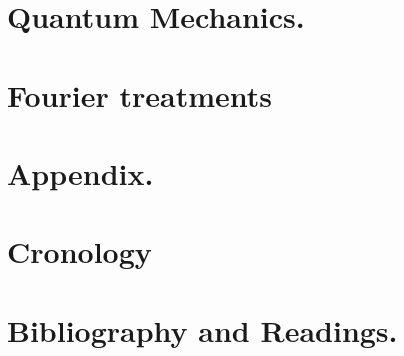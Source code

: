 \documentclass[12pt,leqno]{book}
\begin{document}
\part{Quantum Mechanics.}






\part{Fourier treatments}









\part{Appendix.}





\part{Cronology}

\part{Bibliography and Readings.}




%

%




%
\end{document}
